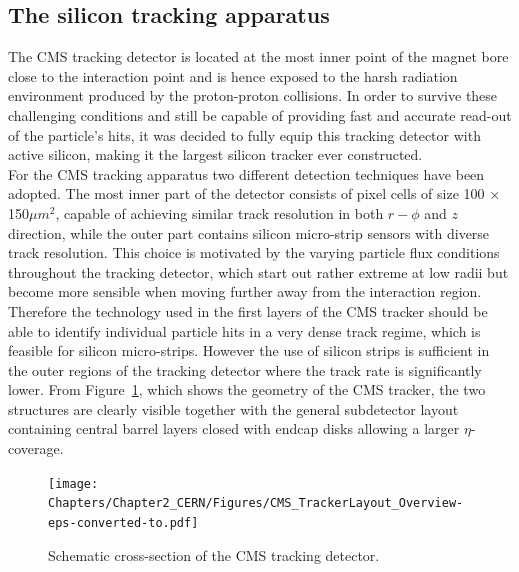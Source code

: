 \subsection{The silicon tracking apparatus}\label{sec::Tracker}
The CMS tracking detector is located at the most inner point of the magnet bore close to the interaction point and is hence exposed to the harsh radiation environment produced by the proton-proton collisions. In order to survive these challenging conditions and still be capable of providing fast and accurate read-out of the particle's hits, it was decided to fully equip this tracking detector with active silicon, making it the largest silicon tracker ever constructed.
\\
For the CMS tracking apparatus two different detection techniques have been adopted.
The most inner part of the detector consists of pixel cells of size 100 $\times$ 150$ \unit{\mu m}^{2}$, capable of achieving similar track resolution in both $r-\phi$ and $z$ direction, while the outer part contains silicon micro-strip sensors with diverse track resolution. 
This choice is motivated by the varying particle flux conditions throughout the tracking detector, which start out rather extreme at low radii but become more sensible when moving further away from the interaction region. 
Therefore the technology used in the first layers of the CMS tracker should be able to identify individual particle hits in a very dense track regime, which is feasible for silicon micro-strips. However the use of silicon strips is sufficient in the outer regions of the tracking detector where the track rate is significantly lower.
From Figure~\ref{fig::CMSTracker}, which shows the geometry of the CMS tracker, the two structures are clearly visible together with the general subdetector layout containing central barrel layers closed with endcap disks allowing a larger $\eta$-coverage.
\begin{figure}[h!t]
 \centering
 \texttt{[image: Chapters/Chapter2\_CERN/Figures/CMS\_TrackerLayout\_Overview-eps-converted-to.pdf]}
 \caption{Schematic cross-section of the CMS tracking detector.} \label{fig::CMSTracker}
\end{figure}

